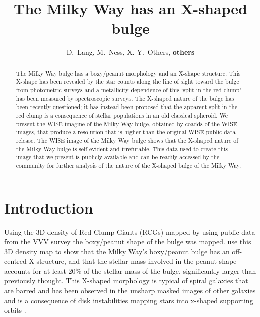 \documentclass[12pt, preprint]{aastex}
\begin{document}
\title{The Milky Way has an X-shaped bulge} 
\author{D.~Lang,
M.~Ness,
X.-Y.~Others,
\textbf{others}}

\begin{abstract}%
The Milky Way bulge has a boxy/peanut morphology and an X-shape structure. This X-shape has been revealed by the 
star counts along the line of sight toward the bulge from photometric surveys and a metallicity dependence of this 
`split in the red clump' has been measured by spectroscopic surveys. The X-shaped nature of the bulge has been recently questioned; it has instead been proposed that the apparent split in the red clump is a consequence of stellar populations in an old classical spheroid. We present the WISE imagine of the Milky Way bulge, obtained by coadds of the WISE images, that produce a resolution that is higher than the original WISE public data release. The WISE image of the Milky Way bulge shows that the X-shaped nature of the Milky Way bulge is self-evident and irrefutable. This data used to create this image that we present is publicly available and can be readily accessed by the community for further analysis of the nature of the X-shaped bulge of the Milky Way. 
\end{abstract}


\keywords{%
}

\section{Introduction}\label{sec:Intro}

Using the 3D density of Red Clump Giants (RCGs) mapped by \citet{Wegg2013}  using public
data from the VVV survey the boxy/peanut shape of the bulge was mapped. \citet{Portail2015} use this 3D density map to show that the Milky Way's boxy/peanut bulge has an off-centred X structure, and that the stellar mass involved in the peanut shape accounts for at least 20\% of the stellar mass of the bulge, significantly larger than previously thought. This X-shaped morphology is typical of spiral galaxies that are barred and has been observed in the unsharp masked images of other galaxies  and is a consequence of disk instabilities mapping stars into x-shaped supporting orbits \citep[e.g.][]{Debattista, Inma, Lia}. 
\end{document}
